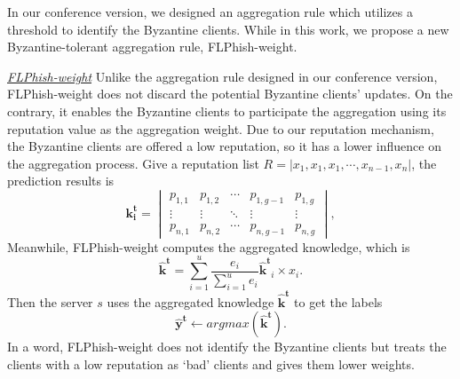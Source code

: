 \documentclass[lettersize,journal]{IEEEtran}
\begin{document}
\par In our conference version, we designed an aggregation rule which utilizes a threshold to identify the Byzantine clients. While in this work, we propose a new Byzantine-tolerant aggregation rule, FLPhish-weight.
\par\textit{\ul{FLPhish-weight}} Unlike the aggregation rule designed in our conference version, FLPhish-weight does not discard the potential Byzantine clients' updates. On the contrary, it enables the Byzantine clients to participate the aggregation using its reputation value as the aggregation weight. Due to our reputation mechanism, the Byzantine clients are offered a low reputation, so it has a lower influence on the aggregation process.
Give a reputation list $R=\left | x_{1},x_{1},x_{1},\cdots ,x_{n-1},x_{n} \right |$, the prediction results is 
\begin{equation}
  \mathbf{k_i^t}=\begin{vmatrix}
    p_{1,1} & p_{1,2} & \cdots  & p_{1,g-1} & p_{1,g}\\ 
    \vdots  & \vdots & \ddots  & \vdots & \vdots\\ 
    p_{n,1} & p_{n,2} & \cdots  & p_{n,g-1} & p_{n,g}
    \end{vmatrix},
\end{equation}
Meanwhile, FLPhish-weight computes the aggregated knowledge, which is
  \begin{equation}
  \mathbf{\hat{k}^t}=\sum_{i=1}^{u}\frac{e_i}{\sum_{i=1}^{u}e_i}\mathbf{\hat{k}^t}_i\times x_{i}.
\end{equation}
Then the server $s$ uses the aggregated knowledge $\mathbf{\hat{k}^t}$ to get the labels
\begin{equation}
  \mathbf{\hat{y}^t}\gets argmax(\mathbf{\hat{k}^t}).
\end{equation} 
In a word, FLPhish-weight does not identify the Byzantine clients but treats the clients with a low reputation as `bad' clients and gives them lower weights.
\end{document}
